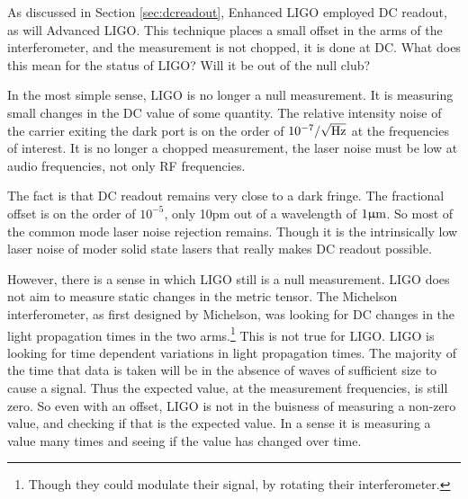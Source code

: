 As discussed in Section \ref{sec:dcreadout}, Enhanced LIGO employed DC readout, as will Advanced LIGO. %
This technique places a small offset in the arms of the interferometer, and the measurement is not chopped, it is done at DC. %
What does this mean for the status of LIGO? %
Will it be out of the null club?

In the most simple sense, LIGO is no longer a null measurement. %
It is measuring small changes in the DC value of some quantity. %
The relative intensity noise of the carrier exiting the dark port is on the order of $10^{-7}/\sqrt{\rm{Hz}}$ at the frequencies of interest. %
It is no longer a chopped measurement, the laser noise must be low at audio frequencies, not only RF frequencies.

The fact is that DC readout remains very close to a dark fringe. %
The fractional offset is on the order of $10^{-5}$, only 10pm out of a wavelength of $1\upmu \rm m$. %
So most of the common mode laser noise rejection remains. %
Though it is the intrinsically low laser noise of moder solid state lasers that really makes DC readout possible.

However, there is a sense in which LIGO still is a null measurement. %
LIGO does not aim to measure static changes in the metric tensor. %
The Michelson interferometer, as first designed by Michelson, was looking for DC changes in the light propagation times in the two arms.\footnote{Though they could modulate their signal, by rotating their interferometer.} This is not true for LIGO. %
LIGO is looking for time dependent variations in light propagation times. %
The majority of the time that data is taken will be in the absence of waves of sufficient size to cause a signal. %
Thus the expected value, at the measurement frequencies, is still zero. %
So even with an offset, LIGO is not in the buisness of measuring a non-zero value, and checking if that is the expected value. %
In a sense it is measuring a value many times and seeing if the value has changed over time.